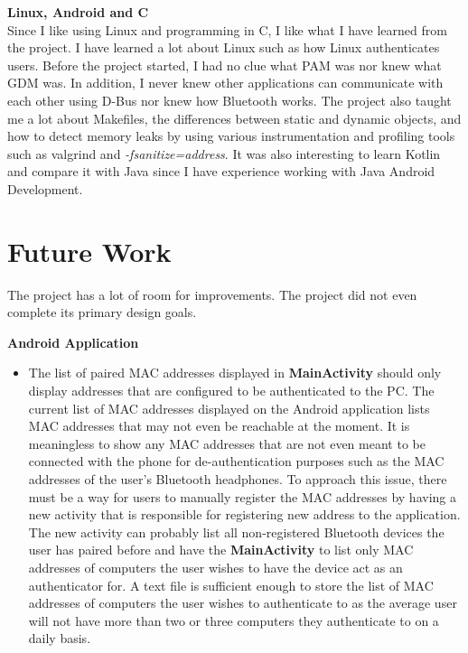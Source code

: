 \documentclass[letterpaper,twocolumn,10pt]{article}
\begin{document}
{{\textbf{Linux, Android and C}\\
Since I like using Linux and programming in C, I like what I have learned from the project. I have learned a lot about Linux such as how Linux authenticates users. Before the project started, I had no clue what PAM was nor knew what GDM was. In addition, I never knew other applications can communicate with each other using D-Bus nor knew how Bluetooth works. The project also taught me a lot about Makefiles, the differences between static and dynamic objects, and how to detect memory leaks by using various instrumentation and profiling tools such as valgrind and \emph{-fsanitize=address}. It was also interesting to learn Kotlin and compare it with Java since I have experience working with Java Android Development.

\section{Future Work}

The project has a lot of room for improvements. The project did not even complete its primary design goals. 

\hrulefill

\textbf{Android Application}
\begin{itemize}
\item The list of paired MAC addresses displayed in \textbf{MainActivity} should only display addresses that are configured to be authenticated to the PC. The current list of MAC addresses displayed on the Android application lists MAC addresses that may not even be reachable at the moment. It is meaningless to show any MAC addresses that are not even meant to be connected with the phone for de-authentication purposes such as the MAC addresses of the user's Bluetooth headphones. To approach this issue, there must be a way for users to manually register the MAC addresses by having a new activity that is responsible for registering new address to the application. The new activity can probably list all non-registered Bluetooth devices the user has paired before and have the \textbf{MainActivity} to list only MAC addresses of computers the user wishes to have the device act as an authenticator for. A text file is sufficient enough to store the list of MAC addresses of computers the user wishes to authenticate to as the average user will not have more than two or three computers they authenticate to on a daily basis.


\end{itemize}}}
\end{document}
